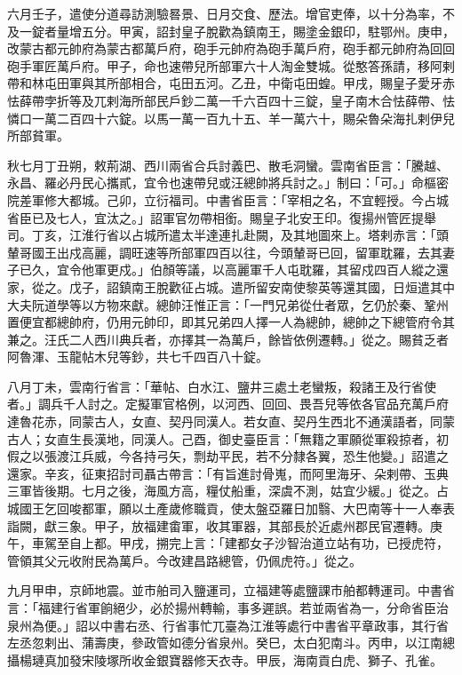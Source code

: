 \begin{pinyinscope}
 六月壬子，遣使分道尋訪測驗晷景、日月交食、歷法。增官吏俸，以十分為率，不及一錠者量增五分。甲寅，詔封皇子脫歡為鎮南王，賜塗金銀印，駐鄂州。庚申，改蒙古都元帥府為蒙古都萬戶府，砲手元帥府為砲手萬戶府，砲手都元帥府為回回砲手軍匠萬戶府。甲子，命也速帶兒所部軍六十人淘金雙城。從憨答孫請，移阿剌帶和林屯田軍與其所部相合，屯田五河。乙丑，中衛屯田蝗。甲戌，賜皇子愛牙赤怯薛帶孛折等及兀剌海所部民戶鈔二萬一千六百四十三錠，皇子南木合怯薛帶、怯憐口一萬二百四十六錠。以馬一萬一百九十五、羊一萬六十，賜朵魯朵海扎剌伊兒所部貧軍。



 秋七月丁丑朔，敕荊湖、西川兩省合兵討義巴、散毛洞蠻。雲南省臣言：「騰越、永昌、羅必丹民心攜貳，宜令也速帶兒或汪總帥將兵討之。」制曰：「可。」命樞密院差軍修大都城。己卯，立衍福司。中書省臣言：「宰相之名，不宜輕授。今占城省臣已及七人，宜汰之。」詔軍官勿帶相銜。賜皇子北安王印。復揚州管匠提舉司。丁亥，江淮行省以占城所遣太半達連扎赴闕，及其地圖來上。塔剌赤言：「頭輦哥國王出戍高麗，調旺速等所部軍四百以往，今頭輦哥已回，留軍耽羅，去其妻子已久，宜令他軍更戍。」伯顏等議，以高麗軍千人屯耽羅，其留戍四百人縱之還家，從之。戊子，詔鎮南王脫歡征占城。遣所留安南使黎英等還其國，日烜遣其中大夫阮道學等以方物來獻。總帥汪惟正言：「一門兄弟從仕者眾，乞仍於秦、鞏州置便宜都總帥府，仍用元帥印，即其兄弟四人擇一人為總帥，總帥之下總管府令其兼之。汪氏二人西川典兵者，亦擇其一為萬戶，餘皆依例遷轉。」從之。賜貧乏者阿魯渾、玉龍帖木兒等鈔，共七千四百八十錠。



 八月丁未，雲南行省言：「華帖、白水江、鹽井三處土老蠻叛，殺諸王及行省使者。」調兵千人討之。定擬軍官格例，以河西、回回、畏吾兒等依各官品充萬戶府達魯花赤，同蒙古人，女直、契丹同漢人。若女直、契丹生西北不通漢語者，同蒙古人；女直生長漢地，同漢人。己酉，御史臺臣言：「無籍之軍願從軍殺掠者，初假之以張渡江兵威，今各持弓矢，剽劫平民，若不分隸各翼，恐生他變。」詔遣之還家。辛亥，征東招討司聶古帶言：「有旨進討骨嵬，而阿里海牙、朵剌帶、玉典三軍皆後期。七月之後，海風方高，糧仗船重，深虞不測，姑宜少緩。」從之。占城國王乞回唆都軍，願以土產歲修職貢，使太盤亞羅日加翳、大巴南等十一人奉表詣闕，獻三象。甲子，放福建畬軍，收其軍器，其部長於近處州郡民官遷轉。庚午，車駕至自上都。甲戌，搠完上言：「建都女子沙智治道立站有功，已授虎符，管領其父元收附民為萬戶。今改建昌路總管，仍佩虎符。」從之。



 九月甲申，京師地震。並市舶司入鹽運司，立福建等處鹽課市舶都轉運司。中書省言：「福建行省軍餉絕少，必於揚州轉輸，事多遲誤。若並兩省為一，分命省臣治泉州為便。」詔以中書右丞、行省事忙兀臺為江淮等處行中書省平章政事，其行省左丞忽剌出、蒲壽庚，參政管如德分省泉州。癸巳，太白犯南斗。丙申，以江南總攝楊璉真加發宋陵塚所收金銀寶器修天衣寺。甲辰，海南貢白虎、獅子、孔雀。




\end{pinyinscope}
